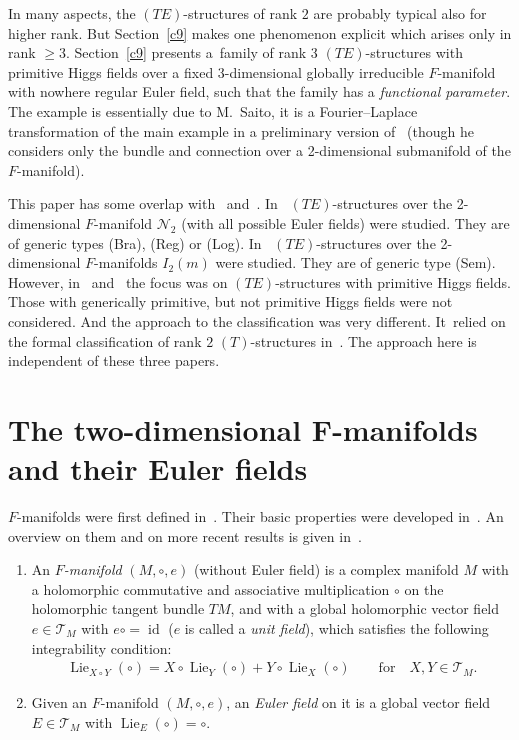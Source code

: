 \documentclass[pdftex]{sigma}%
\numberwithin{equation}{section}
\numberwithin{figure}{section}
\newcommand{\NN}{{\mathcal N}}
\newcommand{\TT}{{\mathcal T}}
\DeclareMathOperator{\id}{id}
\DeclareMathOperator{\Lie}{Lie}
\begin{document}
In many aspects, the $(TE)$-structures of rank $2$ are probably
typical also for higher rank. But Section~\ref{c9} makes
one phenomenon explicit which arises only in rank $\geq 3$.
Section~\ref{c9} presents a~family of
rank 3 $(TE)$-structures with primitive Higgs fields
over a fixed 3-dimensional globally irreducible $F$-manifold
with nowhere regular Euler field, such that the family
has a {\it functional parameter}. The example is essentially
due to M.~Saito, it is a Fourier--Laplace transformation
of the main example in a preliminary version of~\cite{SaM17}
(though he considers only the bundle and connection over
a 2-dimensional submanifold of the $F$-manifold).

This paper has some overlap with~\cite{DH20-3}
and~\cite{DH20-2}. In~\cite{DH20-3} $(TE)$-structures over the 2-dimensional
$F$-manifold $\NN_2$ (with all possible Euler fields)
were studied. They are of generic types (Bra), (Reg) or (Log). In~\cite[Chapter~8]{DH20-2} $(TE)$-structures over the
2-dimensional $F$-manifolds $I_2(m)$ were studied.
They are of generic type (Sem).
However, in~\cite{DH20-3} and~\cite{DH20-2} the focus was on
$(TE)$-structures with primitive Higgs fields.
Those with generically primitive, but not primitive Higgs
fields were not considered. And the approach to the
classification was very different. It~relied on the formal
classification of rank $2$ $(T)$-structures in~\cite{DH20-1}.
The approach here is independent of these three papers.

\section[The two-dimensional $F$-manifolds and their Euler fields]{The two-dimensional $\boldsymbol{F}$-manifolds and their Euler fields}\label{c2}

$F$-manifolds were first defined in~\cite{HM99}.
Their basic properties were developed in~\cite{He02}.
An overview on them and on more recent results is given
in~\cite{DH20-2}.

\begin{Definition}\label{t2.1}\quad
\begin{enumerate}\itemsep=0pt
\item[$(a)$] An {\it $F$-manifold} $(M,\circ,e)$ (without Euler field)
is a complex manifold $M$ with a holomorphic
commutative and associative multiplication $\circ$
on the holomorphic tangent bundle $TM$, and with a
global holomorphic vector field $e\in\TT_M$ with
$e\circ=\id$ ($e$ is called a {\it unit field}),
which satisfies the following integrability condition:
\begin{gather}\label{2.1}
\Lie_{X\circ Y}(\circ)= X\circ\Lie_Y(\circ)+Y\circ\Lie_X(\circ)\qquad
\text{for}\quad X,Y\in\TT_M.
\end{gather}

\item[$(b)$] Given an $F$-manifold $(M,\circ,e)$, an {\it Euler field} on it is a global
vector field $E\in\TT_M$ with $\Lie_E(\circ)=\circ$.
\end{enumerate}
\end{Definition}
\end{document}
